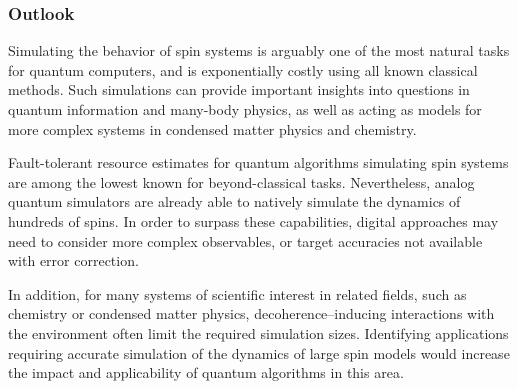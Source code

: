 \begin{refsection}
\subsubsection*{Outlook}
Simulating the behavior of spin systems is arguably one of the most natural tasks for quantum computers, and is exponentially costly using all known classical methods. Such simulations can provide important insights into questions in quantum information and many-body physics, as well as acting as models for more complex systems in condensed matter physics and chemistry.    

Fault-tolerant resource estimates for quantum algorithms simulating spin systems are among the lowest known for beyond-classical tasks. Nevertheless, analog quantum simulators are already able to natively simulate the dynamics of hundreds of spins. In order to surpass these capabilities, digital approaches may need to consider more complex observables, or target accuracies not available with error correction. 

In addition, for many systems of scientific interest in related fields, such as chemistry or condensed matter physics, decoherence--inducing interactions with the environment often limit the required simulation sizes. Identifying applications requiring accurate simulation of the dynamics of large spin models would increase the impact and applicability of quantum algorithms in this area.





\printbibliography[heading=secbib,segment=\therefsegment]

\end{refsection}

